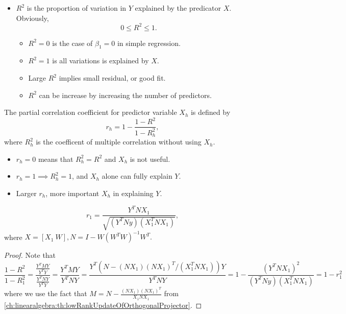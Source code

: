 \begin{refsection}
\begin{remark}\hfill
	\begin{itemize}
		\item $R^2$ is  the proportion of variation in $Y$ explained by the predicator $X$. Obviously, 
		$$0\leq R^2 \leq 1.$$
		\begin{itemize}
			\item $R^2 = 0$ is the case of $\beta_1=0$ in simple regression.
			\item $R^2 = 1$ is all variations is explained by $X$.
			\item Large $R^2$ implies small residual, or good fit.
			\item $R^2$ can be increase by increasing the number of predictors. 
		\end{itemize}
	\end{itemize}
\end{remark}



\begin{definition}\cite[173]{theil1971principles}
The partial correlation coefficient for predictor variable $X_h$ is defined by	
	$$r_h = 1 - \frac{1-R^2}{1-R^2_h},$$
	where $R^2_h$ is the coefficent of multiple correlation without using $X_h$.	
\end{definition}


\begin{remark}\hfill
\begin{itemize}
	\item $r_h = 0$ means that $R_h^2 = R^2$ and $X_h$ is not useful.
	\item $r_h = 1 \implies R_h^2 = 1$, and $X_h$ alone can fully explain $Y$.
	\item Larger $r_h$, more important $X_h$ in explaining $Y$.
\end{itemize}	
\end{remark}



\begin{lemma}\cite[173]{theil1971principles}
	$$r_1 = \frac{Y^TNX_1}{\sqrt{(Y^TNy)(X_1^TNX_1)}},$$
where $X = [X_1 ~ W], N = I - W(W^TW)^{-1}W^T.$	
\end{lemma}
\begin{proof}
Note that 
$$\frac{1-R^2}{1-R_1^2} = \frac{\frac{Y^TMY}{Y^TY}}{\frac{Y^TNY}{Y^TY}} = \frac{Y^TMY}{Y^TNY} = \frac{Y^T(N - (NX_1)(NX_1)^T/(X_1^TNX_1))Y}{Y^TNY} = 1 -\frac{(Y^TNX_1)^2}{(Y^TNy)(X_1^TNX_1)} = 1-r_1^2 $$	
where we use the fact that
$M = N - \frac{(NX_1)(NX_1)^T}{X_1NX_1}$ from \autoref{ch:linearalgebra:th:lowRankUpdateOfOrthogonalProjector}.
\end{proof}




\end{refsection}
